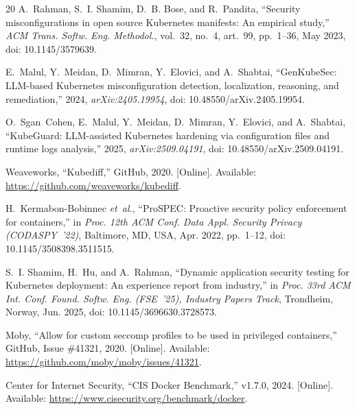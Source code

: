 \documentclass[conference]{IEEEtran}
\begin{document}
\begin{thebibliography}{20}
A.~Rahman, S.~I. Shamim, D.~B. Bose, and R.~Pandita, ``Security misconfigurations in open source Kubernetes manifests: An empirical study,'' \emph{ACM Trans. Softw. Eng. Methodol.}, vol.~32, no.~4, art.~99, pp.~1--36, May 2023, doi: 10.1145/3579639.

E.~Malul, Y.~Meidan, D.~Mimran, Y.~Elovici, and A.~Shabtai, ``GenKubeSec: LLM-based Kubernetes misconfiguration detection, localization, reasoning, and remediation,'' 2024, \emph{arXiv:2405.19954}, doi: 10.48550/arXiv.2405.19954.

O.~Sgan~Cohen, E.~Malul, Y.~Meidan, D.~Mimran, Y.~Elovici, and A.~Shabtai, ``KubeGuard: LLM-assisted Kubernetes hardening via configuration files and runtime logs analysis,'' 2025, \emph{arXiv:2509.04191}, doi: 10.48550/arXiv.2509.04191.

Weaveworks, ``Kubediff,'' GitHub, 2020. [Online]. Available: \url{https://github.com/weaveworks/kubediff}.

H.~Kermabon-Bobinnec \emph{et~al.}, ``ProSPEC: Proactive security policy enforcement for containers,'' in \emph{Proc. 12th ACM Conf. Data Appl. Security Privacy (CODASPY~'22)}, Baltimore, MD, USA, Apr. 2022, pp.~1--12, doi: 10.1145/3508398.3511515.

S.~I. Shamim, H.~Hu, and A.~Rahman, ``Dynamic application security testing for Kubernetes deployment: An experience report from industry,'' in \emph{Proc. 33rd ACM Int. Conf. Found. Softw. Eng. (FSE~'25), Industry Papers Track}, Trondheim, Norway, Jun. 2025, doi: 10.1145/3696630.3728573.

Moby, ``Allow for custom seccomp profiles to be used in privileged containers,'' GitHub, Issue \#41321, 2020. [Online]. Available: \url{https://github.com/moby/moby/issues/41321}.

Center for Internet Security, ``CIS Docker Benchmark,'' v1.7.0, 2024. [Online]. Available: \url{https://www.cisecurity.org/benchmark/docker}.

\end{thebibliography}
\end{document}
